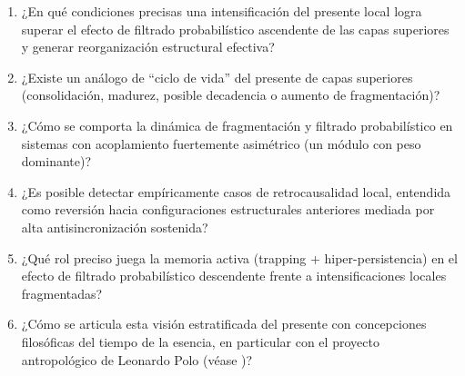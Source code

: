 \begin{enumerate}
    \item ¿En qué condiciones precisas una intensificación del presente local logra superar el efecto de filtrado probabilístico ascendente de las capas superiores y generar reorganización estructural efectiva?
    
    \item ¿Existe un análogo de ``ciclo de vida'' del presente de capas superiores (consolidación, madurez, posible decadencia o aumento de fragmentación)?
    
    \item ¿Cómo se comporta la dinámica de fragmentación y filtrado probabilístico en sistemas con acoplamiento fuertemente asimétrico (un módulo con peso dominante)?
    
    \item ¿Es posible detectar empíricamente casos de retrocausalidad local, entendida como reversión hacia configuraciones estructurales anteriores mediada por alta antisincronización sostenida?
    
    \item ¿Qué rol preciso juega la memoria activa (trapping + hiper-persistencia) en el efecto de filtrado probabilístico descendente frente a intensificaciones locales fragmentadas?
    
    \item ¿Cómo se articula esta visión estratificada del presente con concepciones filosóficas del tiempo de la esencia, en particular con el proyecto antropológico de Leonardo Polo (véase \citep{polo_antropologia_trascendental,padilla_polo_dialogue_2026})?
\end{enumerate}